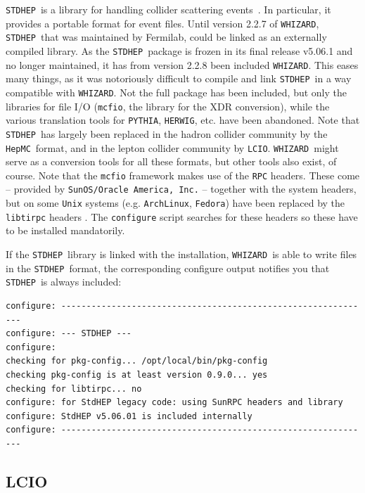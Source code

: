 \documentclass[12pt]{book}
\newcommand{\ttt}[1]{\texttt{#1}}
\newcommand{\whizard}{\ttt{WHIZARD}}
\newcommand{\herwig}{\ttt{HERWIG}}
\newcommand{\pythia}{\ttt{PYTHIA}}
\newcommand{\stdhep}{\ttt{STDHEP}}
\newcommand{\lcio}{\ttt{LCIO}}
\newcommand{\hepmc}{\ttt{HepMC}}
\begin{document}
\stdhep\ is a  library for handling collider scattering
events~\cite{stdhep}.  In particular, it provides a portable format
for event files. Until version 2.2.7 of \whizard, \stdhep\ that was
maintained by Fermilab, could be linked as an externally compiled
library. As the \stdhep\ package is frozen in its final release
v5.06.1 and no longer maintained, it has from version 2.2.8 been
included \whizard. This eases many things, as it was notoriously
difficult to compile and link \stdhep\ in a way compatible with
\whizard. Not the full package has been included, but only the
libraries for file I/O (\ttt{mcfio}, the library for the XDR
conversion), while the various translation tools for \pythia, \herwig,
etc.  have been abandoned. Note that \stdhep\ has largely been
replaced in the hadron collider community by the \hepmc\ format, and
in the lepton collider community by \lcio. \whizard\ might serve as a
conversion tools for all these formats, but other tools also exist, of
course. Note that the \ttt{mcfio} framework makes use of the \ttt{RPC}
headers. These come -- provided by \ttt{SunOS/Oracle America, Inc.} --
together with the system headers, but on some \ttt{Unix} systems
(e.g. \ttt{ArchLinux}, \ttt{Fedora}) have been replaced by the
\ttt{libtirpc} headers . The \ttt{configure} script searches for these
headers so these have to be installed mandatorily.

If the \stdhep\ library is linked with the installation, \whizard\ is
able to write files in the \stdhep\ format, the  corresponding
configure output notifies you that \stdhep\ is always included:
\begin{footnotesize}
\begin{verbatim}
configure: --------------------------------------------------------------
configure: --- STDHEP ---
configure:
checking for pkg-config... /opt/local/bin/pkg-config
checking pkg-config is at least version 0.9.0... yes
checking for libtirpc... no
configure: for StdHEP legacy code: using SunRPC headers and library
configure: StdHEP v5.06.01 is included internally
configure: --------------------------------------------------------------
\end{verbatim}
\end{footnotesize}


\subsection{LCIO}
\label{sec:lcio}
\end{document}
